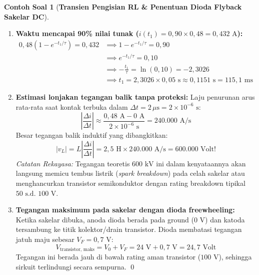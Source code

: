 \documentclass[11pt,a4paper]{article}
\theoremstyle{definition}
\newtheorem{example}{Contoh Soal}[section]
\begin{document}
\begin{example}[\textbf{Transien Pengisian RL \& Penentuan Dioda Flyback Sakelar DC}]
\begin{enumerate}[label=(\alph*), leftmargin=*]
    \item \textbf{Waktu mencapai 90\% nilai tunak ($i(t_1) = 0{,}90 \times 0{,}48 = 0{,}432\text{ A}$):}
    \begin{align*}
        0{,}48 \left( 1 - e^{-t_1/\tau} \right) = 0{,}432 &\implies 1 - e^{-t_1/\tau} = 0{,}90 \\
        &\implies e^{-t_1/\tau} = 0{,}10 \\
        &\implies -\frac{t_1}{\tau} = \ln(0{,}10) = -2{,}3026 \\
        &\implies t_1 = 2{,}3026 \times 0{,}05\text{ s} \approx 0{,}1151\text{ s} = 115{,}1\text{ ms}
    \end{align*}

    \item \textbf{Estimasi lonjakan tegangan balik tanpa proteksi:}
    Laju penurunan arus rata-rata saat kontak terbuka dalam $\Delta t = 2\,\mu\text{s} = 2 \times 10^{-6}\text{ s}$:
    \begin{equation*}
        \left|\frac{\Delta i}{\Delta t}\right| \approx \frac{0{,}48\text{ A} - 0\text{ A}}{2 \times 10^{-6}\text{ s}} = 240.000\text{ A/s}
    \end{equation*}
    Besar tegangan balik induktif yang dibangkitkan:
    \begin{equation*}
        |v_L| = L \left| \frac{\Delta i}{\Delta t} \right| = 2{,}5\text{ H} \times 240.000\text{ A/s} = 600.000\text{ Volt!}
    \end{equation*}
    \textit{Catatan Rekayasa:} Tegangan teoretis $600\text{ kV}$ ini dalam kenyataannya akan langsung memicu tembus listrik (\textit{spark breakdown}) pada celah sakelar atau menghancurkan transistor semikonduktor dengan rating breakdown tipikal $50\text{ s.d. } 100\text{ V}$.

    \item \textbf{Tegangan maksimum pada sakelar dengan dioda freewheeling:}
    Ketika sakelar dibuka, anoda dioda berada pada ground ($0\text{ V}$) dan katoda tersambung ke titik kolektor/drain transistor. Dioda membatasi tegangan jatuh maju sebesar $V_F = 0{,}7\text{ V}$:
    \begin{equation*}
        V_{\text{transistor, maks}} = V_0 + V_F = 24\text{ V} + 0{,}7\text{ V} = 24{,}7\text{ Volt}
    \end{equation*}
    Tegangan ini berada jauh di bawah rating aman transistor ($100\text{ V}$), sehingga sirkuit terlindungi secara sempurna. \qed
\end{enumerate}
\end{example}
\end{document}

